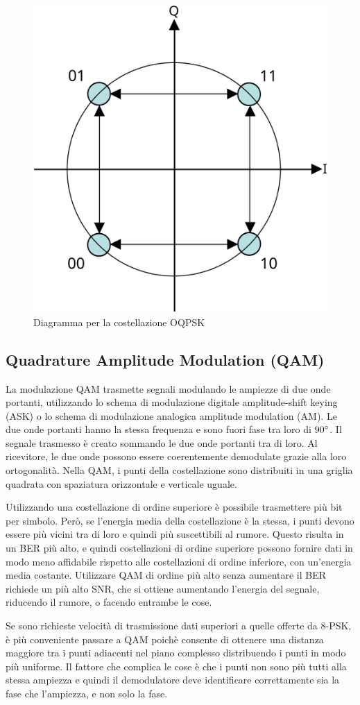 \begin{figure}[htbp]
  \centering
  \includegraphics[width=0.4\linewidth]{./res/img/oqpsk_diagram.png}
  \caption{Diagramma per la costellazione OQPSK}
  \label{fig:oqpsk-diagram}
\end{figure}

\subsection{Quadrature Amplitude Modulation (QAM)}
La modulazione \ac{QAM} trasmette segnali modulando le ampiezze di due onde portanti, utilizzando lo schema di modulazione digitale amplitude-shift keying (ASK) o lo schema di modulazione analogica amplitude modulation (AM). Le due onde portanti hanno la stessa frequenza e sono fuori fase tra loro di $90\degree$.
Il segnale trasmesso è creato sommando le due onde portanti tra di loro.
Al ricevitore, le due onde possono essere coerentemente demodulate grazie alla loro ortogonalità.
Nella \ac{QAM}, i punti della costellazione sono distribuiti in una griglia quadrata con spaziatura orizzontale e verticale uguale.

Utilizzando una costellazione di ordine superiore è possibile trasmettere più bit per simbolo.
Però, se l'energia media della costellazione è la stessa, i punti devono essere più vicini tra di loro e quindi più suscettibili al rumore.
Questo risulta in un \ac{BER} più alto, e quindi costellazioni di ordine superiore possono fornire dati in modo meno affidabile rispetto alle costellazioni di ordine inferiore, con un'energia media costante.
Utilizzare \ac{QAM} di ordine più alto senza aumentare il \ac{BER} richiede un più alto \ac{SNR}, che si ottiene aumentando l'energia del segnale, riducendo il rumore, o facendo entrambe le cose.

Se sono richieste velocità di trasmissione dati superiori a quelle offerte da 8-\ac{PSK}, è più conveniente passare a \ac{QAM} poichè consente di ottenere una distanza maggiore tra i punti adiacenti nel piano complesso distribuendo i punti in modo più uniforme.
Il fattore che complica le cose è che i punti non sono più tutti alla stessa ampiezza e quindi il demodulatore deve identificare correttamente sia la fase che l'ampiezza, e non solo la fase.

